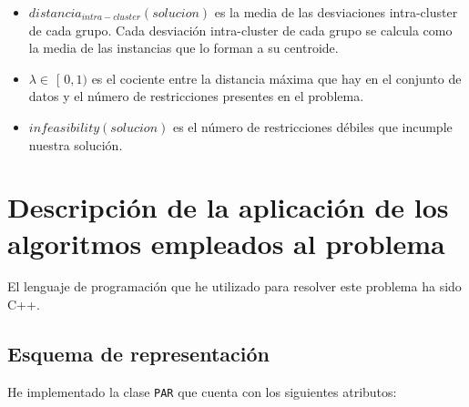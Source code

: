 	\begin{itemize}
		\item $distancia_{intra-cluster} (solucion)$ es la media de las desviaciones intra-cluster de cada grupo. Cada desviación intra-cluster de cada grupo
		se calcula como la media de las instancias que lo forman a su centroide.
		\item $\lambda \in$ [ $0,1)$ es el cociente entre la distancia máxima que hay en el conjunto de datos y el número de restricciones presentes en el problema.
		\item $infeasibility (solucion)$ es el número de restricciones débiles que incumple nuestra solución.
	\end{itemize}

\newpage

\section{Descripción de la aplicación de los algoritmos empleados al problema}
	El lenguaje de programación que he utilizado para resolver este problema ha sido C++.

	\subsection{Esquema de representación}
		He implementado la clase \lstinline!PAR! que cuenta con los siguientes atributos:


